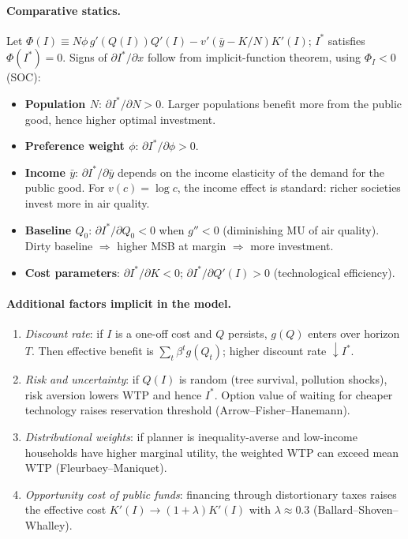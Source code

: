 \documentclass[11pt,a4paper]{article}
\begin{document}
\paragraph{Comparative statics.}
Let $\Phi(I)\equiv N\phi\,g'(Q(I))Q'(I)-v'(\bar y-K/N)K'(I)$; $I^{*}$ satisfies $\Phi(I^{*})=0$. Signs of $\partial I^{*}/\partial x$ follow from implicit-function theorem, using $\Phi_{I}<0$ (SOC):
\begin{itemize}[leftmargin=*,itemsep=1pt]
    \item \textbf{Population $N$}: $\partial I^{*}/\partial N>0$. Larger populations benefit more from the public good, hence higher optimal investment.
    \item \textbf{Preference weight $\phi$}: $\partial I^{*}/\partial \phi>0$.
    \item \textbf{Income $\bar y$}: $\partial I^{*}/\partial \bar y$ depends on the income elasticity of the demand for the public good. For $v(c)=\log c$, the income effect is standard: richer societies invest more in air quality.
    \item \textbf{Baseline $Q_{0}$}: $\partial I^{*}/\partial Q_{0}<0$ when $g''<0$ (diminishing MU of air quality). Dirty baseline $\Rightarrow$ higher MSB at margin $\Rightarrow$ more investment.
    \item \textbf{Cost parameters}: $\partial I^{*}/\partial K<0$; $\partial I^{*}/\partial Q'(I)>0$ (technological efficiency).
\end{itemize}

\paragraph{Additional factors implicit in the model.}
\begin{enumerate}[leftmargin=*,itemsep=1pt]
    \item \emph{Discount rate}: if $I$ is a one-off cost and $Q$ persists, $g(Q)$ enters over horizon $T$. Then effective benefit is $\sum_{t}\beta^{t}g(Q_{t})$; higher discount rate $\downarrow I^{*}$.
    \item \emph{Risk and uncertainty}: if $Q(I)$ is random (tree survival, pollution shocks), risk aversion lowers WTP and hence $I^{*}$. Option value of waiting for cheaper technology raises reservation threshold (Arrow--Fisher--Hanemann).
    \item \emph{Distributional weights}: if planner is inequality-averse and low-income households have higher marginal utility, the weighted WTP can exceed mean WTP (Fleurbaey--Maniquet).
    \item \emph{Opportunity cost of public funds}: financing through distortionary taxes raises the effective cost $K'(I)\to(1+\lambda)K'(I)$ with $\lambda\approx 0.3$ (Ballard--Shoven--Whalley).
\end{enumerate}
\end{document}
